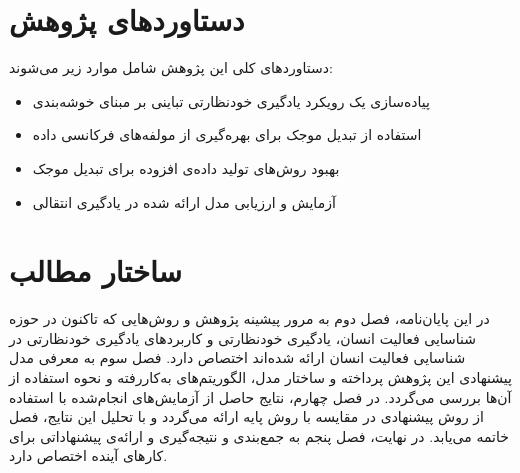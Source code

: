 \section{دستاوردهای پژوهش}

دستاوردهای کلی این پژوهش شامل موارد زیر می‌شوند:

\begin{itemize}
\item{پیاده‌سازی یک رویکرد یادگیری خودنظارتی تباینی بر مبنای خوشه‌بندی}
\item{استفاده از تبدیل موجک برای بهره‌گیری از مولفه‌های فرکانسی داده}
\item{بهبود روش‌های تولید داده‌ی افزوده برای تبدیل موجک}
\item{آزمایش و ارزیابی مدل ارائه شده در یادگیری انتقالی}
\end{itemize}

\section{ساختار مطالب}
در این پایان‌نامه،‌ فصل دوم به مرور پیشینه پژوهش و روش‌هایی که تاکنون در حوزه شناسایی فعالیت انسان، یادگیری خودنظارتی و کاربردهای یادگیری خودنظارتی در شناسایی فعالیت انسان ارائه شده‌اند اختصاص دارد. فصل سوم به معرفی مدل پیشنهادی این پژوهش پرداخته و ساختار مدل، الگوریتم‌های به‌کاررفته و نحوه استفاده از آن‌ها بررسی می‌گردد. در فصل چهارم، نتایج حاصل از آزمایش‌های انجام‌شده با استفاده از روش پیشنهادی در مقایسه با روش پایه ارائه می‌گردد و با تحلیل این نتایج، فصل خاتمه می‌یابد. در نهایت،‌ فصل پنجم به جمع‌بندی و نتیجه‌گیری و ارائه‌ی پیشنهاداتی برای کارهای آینده اختصاص دارد.
